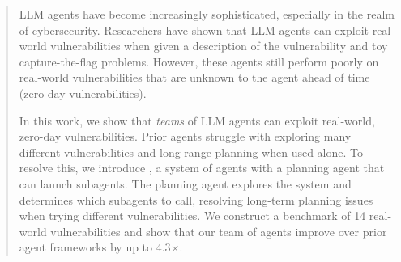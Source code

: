 \begin{abstract}

LLM agents have become increasingly sophisticated, especially in the realm of
cybersecurity. Researchers have shown that LLM agents can exploit real-world
vulnerabilities when given a description of the vulnerability and toy
capture-the-flag problems. However, these agents still perform poorly on
real-world vulnerabilities that are unknown to the agent ahead of time (zero-day
vulnerabilities).

In this work, we show that \emph{teams} of LLM agents can exploit real-world,
zero-day vulnerabilities. Prior agents struggle with exploring many different
vulnerabilities and long-range planning when used alone. To resolve this, we
introduce \sn, a system of agents with a planning agent that can launch
subagents. The planning agent explores the system and determines which subagents
to call, resolving long-term planning issues when trying different
vulnerabilities. We construct a benchmark of 14 real-world vulnerabilities and
show that our team of agents improve over prior agent frameworks by up to 
4.3$\times$.


\end{abstract}

